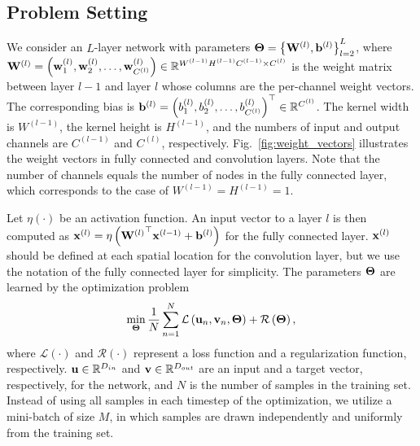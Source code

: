 \documentclass[conference]{IEEEtran}
\begin{document}
\subsection{Problem Setting}\label{subsec:problem_setting}
We consider an $L$-layer network with parameters ${\bf \Theta} = \left \{ {\bf W}^{\left( l \right)}, {\bf b}^{\left( l \right)} \right \}_{l=2}^L$, where 
$ {\bf W}^{\left ( l \right)}  = \left ( {\bf w}_1^{\left ( l \right)},{\bf w}_2^{\left ( l \right)}, \dots,{\bf w}_{C^{\left ( l \right)}}^{\left ( l \right)} \right ) \in \mathbb{R}^{W^{\left ( l-1 \right)} H^{\left ( l-1 \right)} C^{\left ( l-1 \right)} \times C^{\left ( l \right)} } $ 
is the weight matrix between layer $l-1$ and layer $l$ whose columns are the per-channel weight vectors. The corresponding bias is 
$ {\bf b}^{\left ( l \right)}  = \left ( b_1^{\left ( l \right)},b_2^{\left ( l \right)}, \dots ,b_{C^{\left ( l \right)}}^{\left ( l \right)} \right )^\top \in \mathbb{R}^{C^{\left ( l \right)} } $. 
The kernel width is $W^{\left (l-1 \right )}$, the kernel height is $H^{\left (l-1 \right )}$, and the numbers of input and output channels are $C^{\left (l-1 \right )}$ and $C^{\left (l \right )}$, respectively.
Fig.~\ref{fig:weight_vectors} illustrates the weight vectors in fully connected and convolution layers. 
Note that the number of channels equals the number of nodes in the fully connected layer, which corresponds to the case of $W^{\left ( l-1 \right )} = H^{\left ( l-1 \right )} = 1$.

Let $\eta(\cdot)$ be an activation function. An input vector to a layer $l$ is then computed as ${\bf x}^{\left ( l \right )} = \eta \left ( {{\bf W}^{\left ( l \right )}}^\top  {\bf x}^{\left ( l-1 \right )} + {\bf b}^{\left( l \right)} \right )$ for the fully connected layer.
${\bf x}^{\left ( l \right )}$ should be defined at each spatial location for the convolution layer, but we use the notation of the fully connected layer for simplicity.
The parameters ${\bf \Theta}$ are learned by the optimization problem
\begin{align}
	\min_{\bf \Theta} \frac{1}{N} \sum_{n=1}^N {\mathcal L} \left( {\bf u}_n, {\bf v}_n, {\bf \Theta} \right ) + {\mathcal R} \left( {\bf \Theta} \right ), 
\end{align}
where ${\mathcal L}(\cdot)$ and ${\mathcal R}(\cdot)$ represent a loss function and a regularization function, respectively. ${\bf u} \in \mathbb{R}^{D_{in}}$ and ${\bf v} \in \mathbb{R}^{D_{out}}$ are an input and a target vector, respectively, for the network, 
and $N$ is the number of samples in the training set. 
Instead of using all samples in each timestep of the optimization, we utilize a mini-batch of size $M$, in which samples are drawn independently and uniformly from the training set. 
\end{document}
